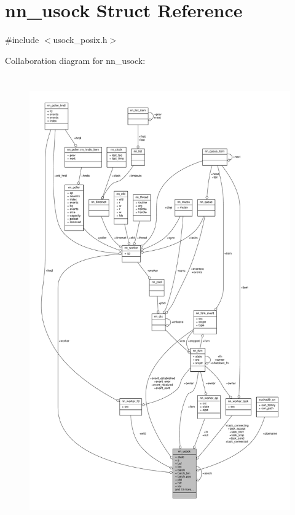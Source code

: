 \hypertarget{structnn__usock}{}\section{nn\+\_\+usock Struct Reference}
\label{structnn__usock}


{\ttfamily \#include $<$usock\+\_\+posix.\+h$>$}



Collaboration diagram for nn\+\_\+usock\+:\nopagebreak
\begin{figure}[H]
\begin{center}
\leavevmode
\includegraphics[height=550pt]{structnn__usock__coll__graph}
\end{center}
\end{figure}
